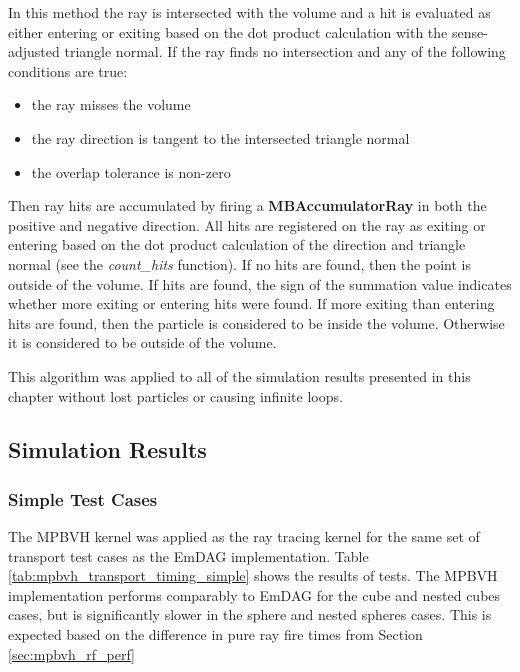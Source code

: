 In this method the ray is intersected with the volume and a hit is evaluated as
either entering or exiting based on the dot product calculation with the
sense-adjusted triangle normal. If the ray finds no intersection and any of the
following conditions are true:

\begin{itemize}
  \item the ray misses the volume
  \item the ray direction is tangent to the intersected triangle normal
  \item the overlap tolerance is non-zero
\end{itemize}

Then ray hits are accumulated by firing a \textbf{MBAccumulatorRay} in both the
positive and negative direction. All hits are registered on the ray as exiting
or entering based on the dot product calculation of the direction and triangle
normal (see the \textit{count\_hits} function). If no hits are found, then the
point is outside of the volume. If hits are found, the sign of the summation
value indicates whether more exiting or entering hits were found. If more
exiting than entering hits are found, then the particle is considered to be
inside the volume. Otherwise it is considered to be outside of the volume.

This algorithm was applied to all of the simulation results presented in this
chapter without lost particles or causing infinite loops.

\subsection{Simulation Results}

\subsubsection{Simple Test Cases}\label{subsec:mpbvh_simple_tests}
The MPBVH kernel was applied as the ray tracing kernel for the same set of
transport test cases as the EmDAG implementation. Table
\ref{tab:mpbvh_transport_timing_simple} shows the results of tests. The MPBVH
implementation performs comparably to EmDAG for the cube and nested cubes cases,
but is significantly slower in the sphere and nested spheres cases. This is
expected based on the difference in pure ray fire times from Section
\ref{sec:mpbvh_rf_perf}

